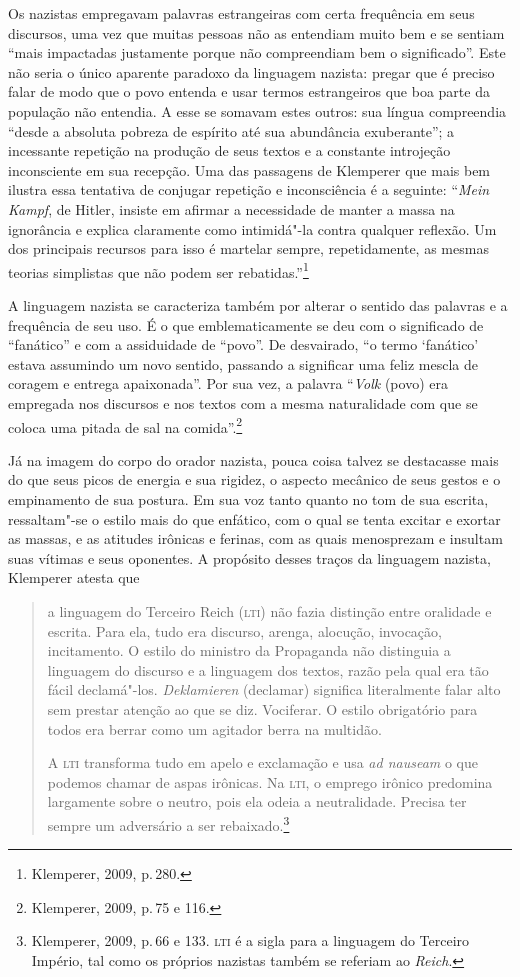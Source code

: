 Os nazistas empregavam palavras estrangeiras com certa frequência em
seus discursos, uma vez que muitas pessoas não as entendiam muito bem e
se sentiam ``mais impactadas justamente porque não compreendiam bem o
significado''. Este não seria o único aparente paradoxo da linguagem
nazista: pregar que é preciso falar de modo que o povo entenda e usar
termos estrangeiros que boa parte da população não entendia. A esse se
somavam estes outros: sua língua compreendia ``desde a absoluta pobreza
de espírito até sua abundância exuberante''; a incessante repetição na
produção de seus textos e a constante introjeção inconsciente em sua
recepção. Uma das passagens de Klemperer que mais bem ilustra essa
tentativa de conjugar repetição e inconsciência é a seguinte:
``\emph{Mein Kampf}, de Hitler, insiste em afirmar a necessidade de
manter a massa na ignorância e explica claramente como intimidá"-la
contra qualquer reflexão. Um dos principais recursos para isso é
martelar sempre, repetidamente, as mesmas teorias simplistas que não
podem ser rebatidas.''\footnote{Klemperer, 2009, p.\,280.}

A linguagem nazista se caracteriza também por alterar o sentido das
palavras e a frequência de seu uso. É o que emblematicamente se deu com
o significado de ``fanático'' e com a assiduidade de ``povo''. De
desvairado, ``o termo `fanático' estava assumindo um novo sentido,
passando a significar uma feliz mescla de coragem e entrega
apaixonada''. Por sua vez, a palavra ``\emph{Volk} (povo) era empregada
nos discursos e nos textos com a mesma naturalidade com que se coloca
uma pitada de sal na comida''.\footnote{Klemperer, 2009, p.\,75 e 116.}

Já na imagem do corpo do orador nazista, pouca coisa talvez se
destacasse mais do que seus picos de energia e sua rigidez, o aspecto
mecânico de seus gestos e o empinamento de sua postura. Em sua voz tanto
quanto no tom de sua escrita, ressaltam"-se o estilo mais do que
enfático, com o qual se tenta excitar e exortar as massas, e as atitudes
irônicas e ferinas, com as quais menosprezam e insultam suas vítimas e
seus oponentes. A propósito desses traços da linguagem nazista,
Klemperer atesta que

\begin{quote}
a linguagem do Terceiro Reich (\textsc{lti}) não fazia distinção entre
oralidade e escrita. Para ela, tudo era discurso, arenga, alocução,
invocação, incitamento. O estilo do ministro da Propaganda não
distinguia a linguagem do discurso e a linguagem dos textos, razão pela
qual era tão fácil declamá"-los. \emph{Deklamieren} (declamar) significa
literalmente falar alto sem prestar atenção ao que se diz. Vociferar. O
estilo obrigatório para todos era berrar como um agitador berra na
multidão.

A \textsc{lti} transforma tudo em apelo e exclamação e usa \emph{ad
nauseam} o que podemos chamar de aspas irônicas. Na \textsc{lti}, o
emprego irônico predomina largamente sobre o neutro, pois ela odeia a
neutralidade. Precisa ter sempre um adversário a ser
rebaixado.\footnote{Klemperer, 2009, p.\,66 e 133. \textsc{lti} é a sigla
  para a linguagem do Terceiro Império, tal como os próprios nazistas
  também se referiam ao \emph{Reich}.}
\end{quote}

